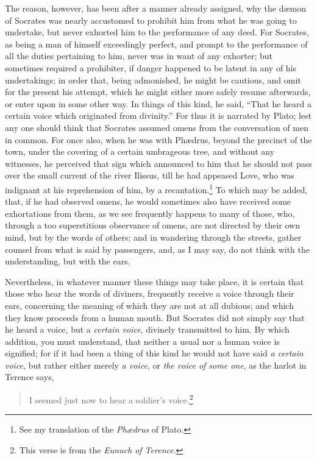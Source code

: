 \documentclass[twoside]{article}
\begin{document}
The reason, however, has been after a manner already assigned, why the
d{\ae}mon of Socrates was nearly accustomed to prohibit him from what he was
going to undertake, but never exhorted him to the performance of any deed. For
Socrates, as being a man of himself exceedingly perfect, and prompt to the
performance of all the duties pertaining to him, never was in want of any
exhorter; but sometimes required a prohibiter, if danger happened to be latent
in any of his undertakings; in order that, being admonished, he might be
cautious, and omit for the present his attempt, which he might either more
safely resume afterwards, or enter upon in some other way. In things of this
kind, he said, ``That he heard a certain voice which originated from
divinity.'' For thus it is narrated by Plato; lest any one should think that
Socrates assumed omens from the conversation of men in common. For once also,
when he was with Ph{\ae}drus, beyond the precinct of the town, under the
covering of a certain umbrageous tree, and without any witnesses, he perceived
that sign which announced to him that he should not pass over the small current
of the river Ilissus, till he had appeased Love, who was indignant at his
reprehension of him, by a recantation.\footnote{See my translation of the
\textit{Ph{\ae}drus} of Plato.} To which may be added, that, if he had observed
omens, he would sometimes also have received some exhortations from them, as we
see frequently happens to many of those, who, through a too superstitious
observance of omens, are not directed by their own mind, but by the words of
others; and in wandering through the streets, gather counsel from what is said
by passengers, and, as I may say, do not think with the understanding, but with
the ears.

Nevertheless, in whatever manner these things may take place, it is certain
that those who hear the words of diviners, frequently receive a voice through
their ears, concerning the meaning of which they are not at all dubious; and
which they know proceeds from a human mouth. But Socrates did not simply say
that he heard a voice, but a \textit{certain voice}, divinely transmitted to
him.  By which addition, you must understand, that neither a usual nor a human
voice is signified; for if it had been a thing of this kind he would not have
said \textit{a certain voice}, but rather either merely \textit{a voice}, or
\textit{the voice of some one}, as the harlot in Terence says,

\begin{verse}
I seemed just now to hear a soldier's voice.\footnote{This verse is from the
\textit{Eunuch of Terence}.}
\end{verse}
\end{document}

